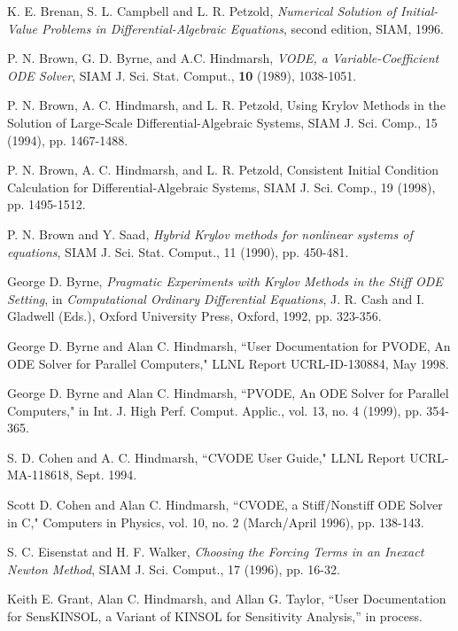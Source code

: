 \documentclass[11pt]{article}
\begin{document}
\begin{thebibliography}{99}

K. E. Brenan, S. L. Campbell and L. R. Petzold, {\em Numerical Solution
of Initial-Value Problems in Differential-Algebraic Equations}, second
edition, SIAM, 1996.

  P. N. Brown, G. D. Byrne, and A.C. Hindmarsh, {\it VODE, a
Variable-Coefficient ODE Solver}, SIAM J. Sci. Stat. Comput., {\bf 10}
(1989), 1038-1051.

P. N. Brown, A. C. Hindmarsh, and L. R. Petzold, Using Krylov
Methods in the Solution of Large-Scale Differential-Algebraic
Systems, SIAM J. Sci. Comp., 15 (1994), pp. 1467-1488.

P. N. Brown, A. C. Hindmarsh, and L. R. Petzold, Consistent
Initial Condition Calculation for Differential-Algebraic
Systems, SIAM J. Sci. Comp., 19 (1998), pp. 1495-1512.

P. N. Brown and Y. Saad, {\it Hybrid Krylov methods for nonlinear
systems of equations}, SIAM J. Sci. Stat. Comput., 11 (1990),
pp. 450-481.

  George D. Byrne, {\it Pragmatic Experiments with Krylov
Methods in the Stiff ODE Setting}, in {\it Computational Ordinary
Differential Equations}, J. R. Cash and I. Gladwell (Eds.), Oxford
University Press, Oxford, 1992, pp. 323-356.

George D. Byrne and Alan C. Hindmarsh, ``User Documentation for PVODE,
An ODE Solver for Parallel Computers," LLNL Report UCRL-ID-130884,
May 1998.

George D. Byrne and Alan C. Hindmarsh, ``PVODE, An ODE Solver for
Parallel Computers," in Int. J. High Perf. Comput. Applic., vol. 13,
no. 4 (1999), pp. 354-365.

S. D. Cohen and A. C. Hindmarsh, ``CVODE User Guide," LLNL Report
UCRL-MA-118618, Sept. 1994.

Scott D. Cohen and Alan C. Hindmarsh, ``CVODE, a Stiff/Nonstiff ODE
Solver in C," Computers in Physics, vol. 10, no. 2 (March/April 1996),
pp. 138-143.

S. C. Eisenstat and H. F. Walker, {\it Choosing the Forcing Terms in
an Inexact Newton Method}, SIAM J. Sci. Comput., 17 (1996), pp. 16-32.

Keith E. Grant, Alan C. Hindmarsh, and Allan G. Taylor, ``User
Documentation for SensKINSOL, a Variant of KINSOL for Sensitivity
Analysis,'' in process.


\end{thebibliography}
\end{document}
